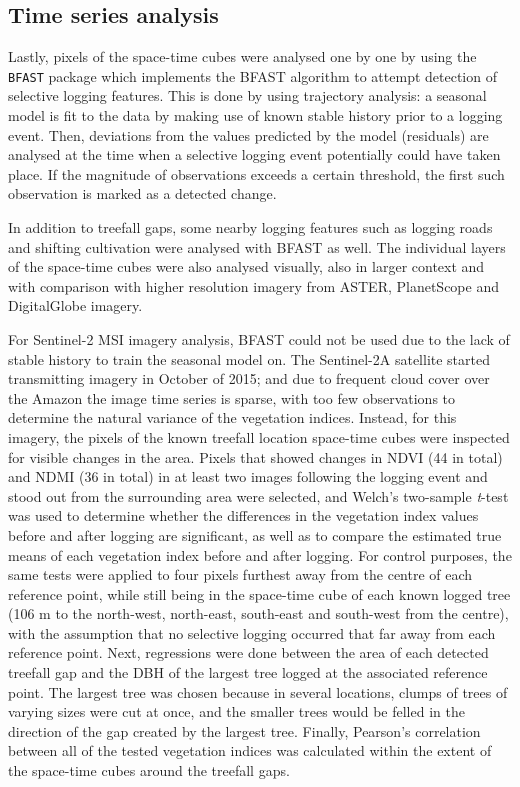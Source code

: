 \documentclass[a4paper,12pt]{scrbook}
\begin{document}
\subsection{Time series analysis}

Lastly, pixels of the space-time cubes were analysed one by one by using the \texttt{BFAST} package which implements the \ac{BFAST} algorithm \citep{verbesselt_detecting_2010} to attempt detection of selective logging features. This is done by using trajectory analysis: a seasonal model is fit to the data by making use of known stable history prior to a logging event. Then, deviations from the values predicted by the model (residuals) are analysed at the time when a selective logging event potentially could have taken place. If the magnitude of observations exceeds a certain threshold, the first such observation is marked as a detected change.

In addition to treefall gaps, some nearby logging features such as logging roads and shifting cultivation were analysed with \ac{BFAST} as well. The individual layers of the space-time cubes were also analysed visually, also in larger context and with comparison with higher resolution imagery from \ac{ASTER}, PlanetScope and DigitalGlobe imagery.

For Sentinel-2 \ac{MSI} imagery analysis, \ac{BFAST} could not be used due to the lack of stable history to train the seasonal model on. The Sentinel-2A satellite started transmitting imagery in October of 2015; and due to frequent cloud cover over the Amazon the image time series is sparse, with too few observations to determine the natural variance of the vegetation indices. Instead, for this imagery, the pixels of the known treefall location space-time cubes were inspected for visible changes in the area. Pixels that showed changes in NDVI (44 in total) and NDMI (36 in total) in at least two images following the logging event and stood out from the surrounding area were selected, and Welch's two-sample \textit{t}-test was used to determine whether the differences in the vegetation index values before and after logging are significant, as well as to compare the estimated true means of each vegetation index before and after logging. For control purposes, the same tests were applied to four pixels furthest away from the centre of each reference point, while still being in the space-time cube of each known logged tree (106 m to the north-west, north-east, south-east and south-west from the centre), with the assumption that no selective logging occurred that far away from each reference point. Next, regressions were done between the area of each detected treefall gap and the \ac{DBH} of the largest tree logged at the associated reference point. The largest tree was chosen because in several locations, clumps of trees of varying sizes were cut at once, and the smaller trees would be felled in the direction of the gap created by the largest tree. Finally, Pearson's correlation between all of the tested vegetation indices was calculated within the extent of the space-time cubes around the treefall gaps.
\end{document}
